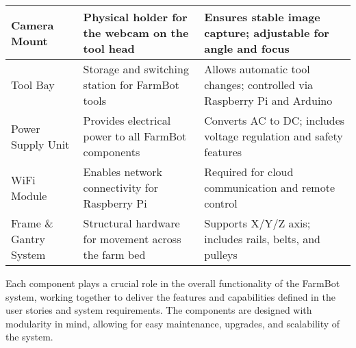 \begin{longtable}{|p{}|p{}|p{}|}
\hline
Camera Mount & Physical holder for the webcam on the tool head & Ensures stable image capture; adjustable for angle and focus \\
\hline
Tool Bay & Storage and switching station for FarmBot tools & Allows automatic tool changes; controlled via Raspberry Pi and Arduino \\
\hline
Power Supply Unit & Provides electrical power to all FarmBot components & Converts AC to DC; includes voltage regulation and safety features \\
\hline
WiFi Module & Enables network connectivity for Raspberry Pi & Required for cloud communication and remote control \\
\hline
Frame \& Gantry System & Structural hardware for movement across the farm bed & Supports X/Y/Z axis; includes rails, belts, and pulleys \\
\hline
\end{longtable}

Each component plays a crucial role in the overall functionality of the FarmBot system, working together to deliver the features and capabilities defined in the user stories and system requirements. The components are designed with modularity in mind, allowing for easy maintenance, upgrades, and scalability of the system.
